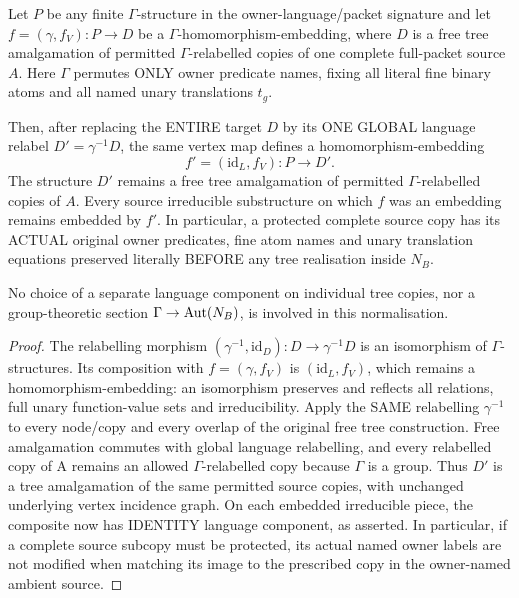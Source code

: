 \begin{lemma}
\label{lem:hkn-global-language-normalisation}
Let $P$ be any finite $\Gamma$-structure
in the owner-language/packet signature
and let $f=(\gamma,f_V):P\to D$ be a
$\Gamma$-homomorphism-embedding, where
$D$ is a free tree amalgamation of
permitted $\Gamma$-relabelled copies
of one complete full-packet source $A$.
Here $\Gamma$ permutes ONLY owner
predicate names, fixing all literal
fine binary atoms and all named
unary translations $t_g$.

Then, after replacing the ENTIRE
target $D$ by its ONE GLOBAL language
relabel $D'=\gamma^{-1}D$, the same
vertex map defines a
homomorphism-embedding
\[
              f'=(\mathrm{id}_L,f_V):P\to D'.
\tag{HLN}\label{eq:hkn-global-language-normalisation}
\]
The structure $D'$ remains a free
tree amalgamation of permitted
$\Gamma$-relabelled copies of $A$.
Every source irreducible substructure
on which $f$ was an embedding
remains embedded by $f'$.
In particular, a protected complete
source copy has its ACTUAL original
owner predicates, fine atom names
and unary translation equations
preserved literally BEFORE any
tree realisation inside $N_B$.

No choice of a separate language
component on individual tree
copies, nor a group-theoretic
section $\Gamma\to\operatorname{Aut}(N_B)$, is
involved in this normalisation.
\end{lemma}
\begin{proof}
The relabelling morphism
$(\gamma^{-1},\mathrm{id}_D):
D\to\gamma^{-1}D$
is an isomorphism of
$\Gamma$-structures.
Its composition with
$f=(\gamma,f_V)$ is
$(\mathrm{id}_L,f_V)$,
which remains a
homomorphism-embedding:
an isomorphism preserves
and reflects all relations,
full unary function-value
sets and irreducibility.
Apply the SAME relabelling
$\gamma^{-1}$ to every
node/copy and every overlap
of the original free tree
construction. Free
amalgamation commutes with
global language relabelling,
and every relabelled copy
of A remains an allowed
$\Gamma$-relabelled copy
because $\Gamma$ is a group.
Thus $D'$ is a tree
amalgamation of the same
permitted source copies,
with unchanged underlying
vertex incidence graph.
On each embedded irreducible
piece, the composite now has
IDENTITY language component,
as asserted. In particular,
if a complete source subcopy
must be protected, its actual
named owner labels are not
modified when matching its
image to the prescribed
copy in the owner-named
ambient source.
\end{proof}

